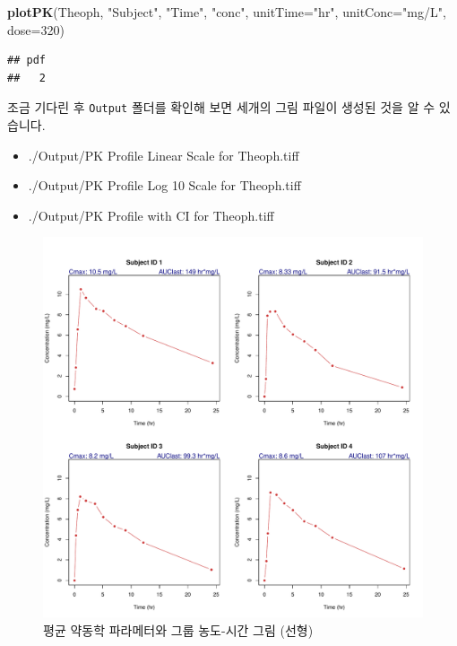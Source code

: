 \documentclass[
  12pt,
]{krantz}
\newenvironment{Shaded}{\begin{snugshade}}{\end{snugshade}}
\newcommand{\DataTypeTok}[1]{\textcolor[rgb]{0.13,0.29,0.53}{#1}}
\newcommand{\DecValTok}[1]{\textcolor[rgb]{0.00,0.00,0.81}{#1}}
\newcommand{\KeywordTok}[1]{\textcolor[rgb]{0.13,0.29,0.53}{\textbf{#1}}}
\newcommand{\NormalTok}[1]{#1}
\newcommand{\StringTok}[1]{\textcolor[rgb]{0.31,0.60,0.02}{#1}}
\providecommand{\tightlist}{%
  \setlength{\itemsep}{0pt}\setlength{\parskip}{0pt}}
\begin{document}
\begin{Shaded}
\begin{Highlighting}[]
\KeywordTok{plotPK}\NormalTok{(Theoph, }\StringTok{"Subject"}\NormalTok{, }\StringTok{"Time"}\NormalTok{, }\StringTok{"conc"}\NormalTok{, }\DataTypeTok{unitTime=}\StringTok{"hr"}\NormalTok{, }\DataTypeTok{unitConc=}\StringTok{"mg/L"}\NormalTok{, }\DataTypeTok{dose=}\DecValTok{320}\NormalTok{)}
\end{Highlighting}
\end{Shaded}

\begin{verbatim}
## pdf 
##   2
\end{verbatim}

조금 기다린 후 \texttt{Output} 폴더를 확인해 보면 세개의 그림 파일이 생성된 것을 알 수 있습니다.

\begin{itemize}
\tightlist
\item
  ./Output/PK Profile Linear Scale for Theoph.tiff
\item
  ./Output/PK Profile Log 10 Scale for Theoph.tiff
\item
  ./Output/PK Profile with CI for Theoph.tiff
\end{itemize}

\begin{figure}
\includegraphics[width=1\linewidth]{Output/Individual PK Linear Scale for Theoph} \caption{평균 약동학 파라메터와 그룹 농도-시간 그림 (선형)}\label{fig:unnamed-chunk-5}
\end{figure}
\end{document}
